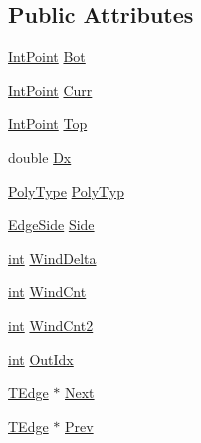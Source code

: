 \subsection*{Public Attributes}
\begin{DoxyCompactItemize}
\item 
\mbox{\hyperlink{struct_clipper_lib_1_1_int_point}{Int\+Point}} \mbox{\hyperlink{struct_clipper_lib_1_1_t_edge_adddb6b117ed14437613d26cc456bb4bc}{Bot}}
\item 
\mbox{\hyperlink{struct_clipper_lib_1_1_int_point}{Int\+Point}} \mbox{\hyperlink{struct_clipper_lib_1_1_t_edge_ad5932926d3d5d6ed6ae4bc991ed7bcec}{Curr}}
\item 
\mbox{\hyperlink{struct_clipper_lib_1_1_int_point}{Int\+Point}} \mbox{\hyperlink{struct_clipper_lib_1_1_t_edge_a9f09500b780f7492d8c4c511aabf1c96}{Top}}
\item 
double \mbox{\hyperlink{struct_clipper_lib_1_1_t_edge_ace215b877c384f917d18f6c1da913959}{Dx}}
\item 
\mbox{\hyperlink{namespace_clipper_lib_a50d662440e5e100070014ed91281e960}{Poly\+Type}} \mbox{\hyperlink{struct_clipper_lib_1_1_t_edge_aedc0a4d8b17ae3e42555621b22af8296}{Poly\+Typ}}
\item 
\mbox{\hyperlink{namespace_clipper_lib_a0e8e5a1032917a06fbbf958f7a708f3f}{Edge\+Side}} \mbox{\hyperlink{struct_clipper_lib_1_1_t_edge_aa7840242535b7830744f4387aa53bdfa}{Side}}
\item 
\mbox{\hyperlink{draw_8hh_aa620a13339ac3a1177c86edc549fda9b}{int}} \mbox{\hyperlink{struct_clipper_lib_1_1_t_edge_afd72e2c7b9f97706ead72907509f8bc1}{Wind\+Delta}}
\item 
\mbox{\hyperlink{draw_8hh_aa620a13339ac3a1177c86edc549fda9b}{int}} \mbox{\hyperlink{struct_clipper_lib_1_1_t_edge_ad7df0e20b58e4c6bddcfc7faf0003d4c}{Wind\+Cnt}}
\item 
\mbox{\hyperlink{draw_8hh_aa620a13339ac3a1177c86edc549fda9b}{int}} \mbox{\hyperlink{struct_clipper_lib_1_1_t_edge_a50ccbb54513e60a39132dfca7c9b40f4}{Wind\+Cnt2}}
\item 
\mbox{\hyperlink{draw_8hh_aa620a13339ac3a1177c86edc549fda9b}{int}} \mbox{\hyperlink{struct_clipper_lib_1_1_t_edge_a85d226803a3c54dbc983668f430b7e28}{Out\+Idx}}
\item 
\mbox{\hyperlink{struct_clipper_lib_1_1_t_edge}{T\+Edge}} $\ast$ \mbox{\hyperlink{struct_clipper_lib_1_1_t_edge_af63cea19f1590922691d1a3a90e4173d}{Next}}
\item 
\mbox{\hyperlink{struct_clipper_lib_1_1_t_edge}{T\+Edge}} $\ast$ \mbox{\hyperlink{struct_clipper_lib_1_1_t_edge_a2713de57bcc285aaee2b9e1f5023bebc}{Prev}}

\end{DoxyCompactItemize}
